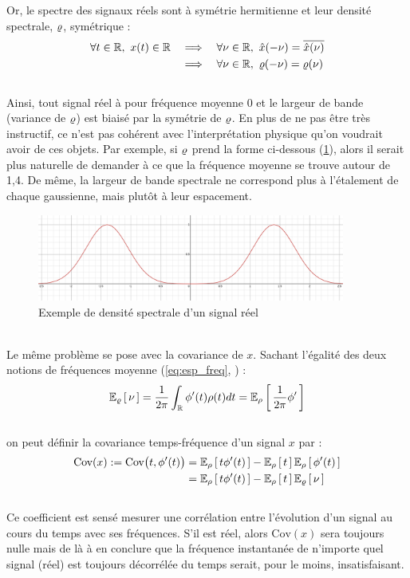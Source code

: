 Or, le spectre des signaux réels sont à symétrie hermitienne et leur densité spectrale, $\densis$, symétrique :
\begin{align*}
	\forall t\in\R,\ x(t)\in\R \quad &\Lr \quad \forall \nu\in\R,\ \fou{x}(-\nu) = \congu{\fou{x}(\nu)} \\
	&\Lr \quad \forall \nu\in\R,\ \densis(-\nu) = \densis(\nu)
\end{align*}
\skipl \\
Ainsi, tout signal réel à pour fréquence moyenne 0 et le largeur de bande (variance de $\densis$) est biaisé par la symétrie de $\densis$. 
En plus de ne pas être très instructif, ce n'est pas cohérent avec l'interprétation physique qu'on voudrait avoir de ces objets. Par exemple, si $\densis$ prend la forme ci-dessous (\cref{fig:densi_spec_sym}), alors il serait plus naturelle de demander à ce que la fréquence moyenne se trouve autour de 1,4. De même, la largeur de bande spectrale ne correspond plus à l'étalement de chaque gaussienne, mais plutôt à leur espacement.
\\
\begin{figure}[h]\centering
	\includegraphics[width=0.9\textwidth]{fig/part-1/densi_spec_sym}
	\caption{\DONE Exemple de densité spectrale d'un signal réel}
	\label{fig:densi_spec_sym}
\end{figure}
\\
Le même problème se pose avec la covariance de $x$. Sachant l'égalité des deux notions de fréquences moyenne (\cref{eq:esp_freq}, ) :
\[\esp[\densis]{\nu} = \frac{1}{2\pi}\int_\R \phi'(t)\densit(t)dt = \esp[\densit]{\frac{1}{2\pi} \phi'}\]
\\
on peut définir la covariance temps-fréquence d'un signal $x$ par :
\begin{align*}
	\text{Cov}(x) \defeq \text{Cov}\big(t,\phi'(t) \big) 
	&= \esp[\densit]{t\phi'(t)} - \esp[\densit]{t} \esp[\densit]{\phi'(t)} \\
	&= \esp[\densit]{t\phi'(t)} - \esp[\densit]{t} \esp[\densis]{\nu}	
\end{align*}
\\
Ce coefficient est sensé mesurer une corrélation entre l'évolution d'un signal au cours du temps avec ses fréquences. S'il est réel, alors  $\text{Cov}(x)$ sera toujours nulle mais de là à en conclure que la fréquence instantanée de n'importe quel signal (réel) est toujours décorrélée du temps serait, pour le moins, insatisfaisant.
\\

